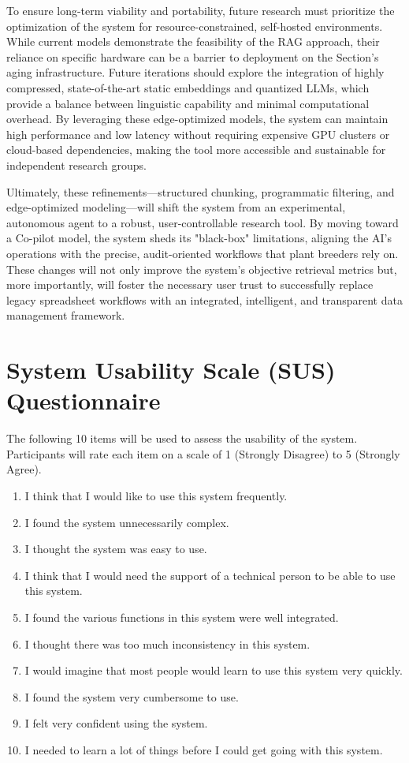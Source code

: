 \documentclass[journal]{./IEEE/IEEEtran}
\begin{document}
To ensure long-term viability and portability, future research must prioritize the optimization of the system for resource-constrained, self-hosted environments. While current models demonstrate the feasibility of the RAG approach, their reliance on specific hardware can be a barrier to deployment on the Section's aging infrastructure. Future iterations should explore the integration of highly compressed, state-of-the-art static embeddings and quantized LLMs, which provide a balance between linguistic capability and minimal computational overhead. By leveraging these edge-optimized models, the system can maintain high performance and low latency without requiring expensive GPU clusters or cloud-based dependencies, making the tool more accessible and sustainable for independent research groups.

Ultimately, these refinements—structured chunking, programmatic filtering, and edge-optimized modeling—will shift the system from an experimental, autonomous agent to a robust, user-controllable research tool. By moving toward a Co-pilot model, the system sheds its "black-box" limitations, aligning the AI’s operations with the precise, audit-oriented workflows that plant breeders rely on. These changes will not only improve the system's objective retrieval metrics but, more importantly, will foster the necessary user trust to successfully replace legacy spreadsheet workflows with an integrated, intelligent, and transparent data management framework.
\appendices

\section{System Usability Scale (SUS) Questionnaire}
The following 10 items will be used to assess the usability of the system. Participants will rate each item on a scale of 1 (Strongly Disagree) to 5 (Strongly Agree).

\begin{enumerate}
    \item I think that I would like to use this system frequently.
    \item I found the system unnecessarily complex.
    \item I thought the system was easy to use.
    \item I think that I would need the support of a technical person to be able to use this system.
    \item I found the various functions in this system were well integrated.
    \item I thought there was too much inconsistency in this system.
    \item I would imagine that most people would learn to use this system very quickly.
    \item I found the system very cumbersome to use.
    \item I felt very confident using the system.
    \item I needed to learn a lot of things before I could get going with this system.
\end{enumerate}
\end{document}
